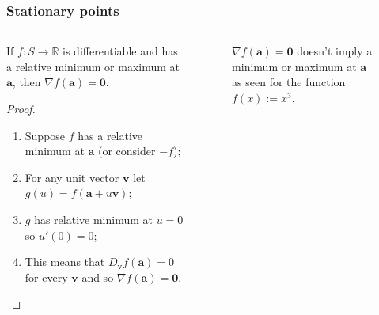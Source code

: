 \documentclass[aspectratio=169,handout]{beamer}
\newcommand{\bR}{\mathbb{R}} %
\renewcommand{\aa}{\mathbf{a}}
\newcommand{\vv}{\mathbf{v}}
\begin{document}
\begin{frame}
    \frametitle{Stationary points}


    \begin{columns}
        \begin{column}{.5\textwidth}

            \begin{theorem}
                If \(f:S\to\bR\) is differentiable and has a relative minimum or maximum at \(\aa\), then \(\nabla f(\aa)=  \mathbf{0}\).
            \end{theorem}

            \begin{proof}
                \begin{enumerate}
                    \item Suppose \(f\) has a relative minimum at \(\aa\) (or consider \(-f\));
                    \item For any unit vector \(\vv\) let \(g(u) = f(\aa+u\vv)\);
                    \item \(g\) has relative minimum at \(u=0\) so \(u'(0)=0\);
                    \item This means that \(D_{\vv} f(\aa) = 0\) for every \(\vv\) and so \(\nabla f (\aa)= \mathbf{0}\). \qedhere
                \end{enumerate}
            \end{proof}
        \end{column}
        \begin{column}{.5\textwidth}
            \begin{figure}
                \caption{\(\nabla f(\aa) =  \mathbf{0}\) doesn't imply a minimum or maximum at \(\aa\) as seen for the function \(f(x):=x^3\).}
            \end{figure}
        \end{column}
    \end{columns}

\end{frame}
\end{document}
